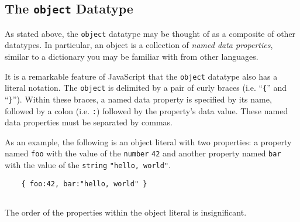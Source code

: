 \documentclass[11pt,letter]{book}
\begin{document}
    \subsection{The \texttt{object} Datatype}
    
    As stated above, the \texttt{object} datatype may be thought of as a composite of other 
    datatypes. In particular, an object is a collection of \emph{named data properties}, similar
    to a dictionary you may be familiar with from other languages.
    
    It is a remarkable feature of JavaScript that the \texttt{object} datatype also has a literal
    notation. The \texttt{object} is delimited by a pair of curly braces (i.e. ``\texttt{\{}'' and 
    ``\texttt{\}}''). Within these braces, a named data property is specified by its name, followed
    by a colon (i.e. \texttt{:}) followed by the property's data value. These named data properties
    must be separated by commas.
    
    As an example, the following is an object literal with two properties: a property named 
    \texttt{foo} with the value of the \texttt{number} \texttt{42} and another property named 
    \texttt{bar} with the value of the \texttt{string} \texttt{"hello, world"}.
    
    \begin{verbatim}
    { foo:42, bar:"hello, world" }
    
    \end{verbatim}
    
    The order of the properties within the object literal is insignificant.
    
    
    
    
    
    
    
\end{document}
